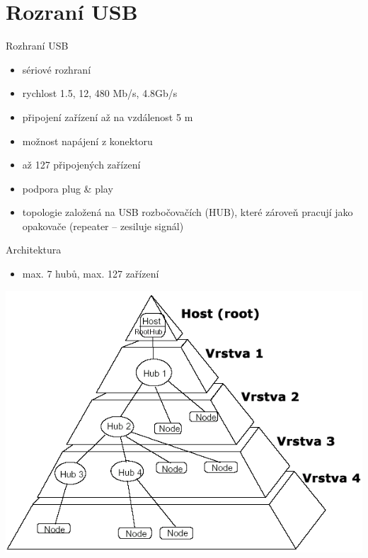 \documentclass[aspectratio=43]{beamer}
\begin{document}
\section{Rozraní USB}
\begin{frame}{Rozhraní USB}
	\begin{itemize}
		\item sériové rozhraní
		\item rychlost 1.5, 12, 480 Mb/s, 4.8Gb/s
		\item připojení zařízení až na vzdálenost 5 m
		\item možnost napájení z konektoru
		\item až 127 připojených zařízení
		\item podpora plug \& play
		\item topologie založená na USB rozbočovačích (HUB), které zároveň pracují jako opakovače (repeater – zesiluje signál)
	\end{itemize}
	
	
\end{frame}


\begin{frame}{Architektura}
	\begin{itemize}
		\item max. 7 hubů, max. 127 zařízení
	\end{itemize}
	\begin{center}
		\includegraphics[width=0.8\linewidth]{extrahovane_obrazky/img_3_page2_0.png}
	\end{center}
	
\end{frame}
\end{document}
